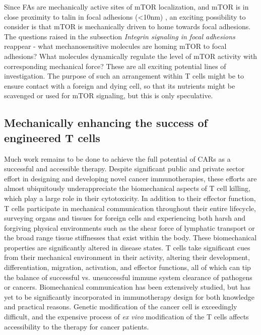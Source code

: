 Since FAs are mechanically active sites of mTOR localization, and mTOR is in close proximity to talin in focal adhesions (\textless 10nm) \cite{Rabanal-Ruiz2021}, an exciting possibility to consider is that mTOR is mechanically driven to home towards focal adhesions. The questions raised in the subsection \textit{Integrin signaling in focal adhesions} reappear - what mechanosensitive molecules are homing mTOR to focal adhesions? What molecules dynamically regulate the level of mTOR activity with corresponding mechanical force? These are all exciting potential lines of investigation. The purpose of such an arrangement within T cells might be to ensure contact with a foreign and dying cell, so that its nutrients might be scavenged or used for mTOR signaling, but this is only speculative.

\subsection{Mechanically enhancing the success of engineered T cells}

Much work remains to be done to achieve the full potential of CARs as a successful and accessible therapy. Despite significant public and private sector effort in designing and developing novel cancer immunotherapies, these efforts are almost ubiquitously underappreciate the biomechanical aspects of T cell killing, which play a large role in their cytotoxicity. In addition to their effector function, T cells participate in mechanical communication throughout their entire lifecycle, surveying organs and tissues for foreign cells and experiencing both harsh and forgiving physical environments such as the shear force of lymphatic transport or the broad range tissue stiffnesses that exist within the body. These biomechanical properties are significantly altered in disease states. T cells take significant cues from their mechanical environment in their activity, altering their development, differentiation, migration, activation, and effector functions, all of which can tip the balance of successful vs. unsuccessful immune system clearance of pathogens or cancers. Biomechanical communication has been extensively studied, but has yet to be significantly incorporated in immunotherapy design for both knowledge and practical reasons. Genetic modification of the cancer cell is exceedingly difficult, and the expensive process of \textit{ex vivo} modification of the T cells affects accessibility to the therapy for cancer patients.

